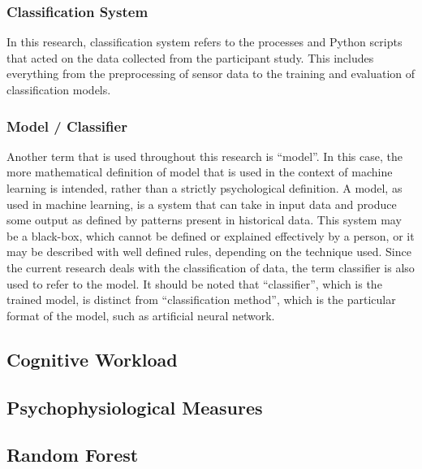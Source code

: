 \documentclass[11pt]{article}
\begin{document}
		\subsubsection{Classification System}
		In this research, classification system refers to the processes and Python scripts that acted on the data collected from the participant study. This includes everything from the preprocessing of sensor data to the training and evaluation of classification models. 		
		
		\subsubsection{Model / Classifier}
		Another term that is used throughout this research is ``model''. In this case, the more mathematical definition of model that is used in the context of machine learning is intended, rather than a strictly psychological definition. A model, as used in machine learning, is a system that can take in input data and produce some output as defined by patterns present in historical data. This system may be a black-box, which cannot be defined or explained effectively by a person, or it may be described with well defined rules, depending on the technique used. Since the current research deals with the classification of data, the term classifier is also used to refer to the model. It should be noted that ``classifier'', which is the trained model, is distinct from ``classification method'', which is the particular format of the model, such as artificial neural network.
	
	\subsection{Cognitive Workload}

	\subsection{Psychophysiological Measures}
	
	\subsection{Random Forest}
	
\end{document}
